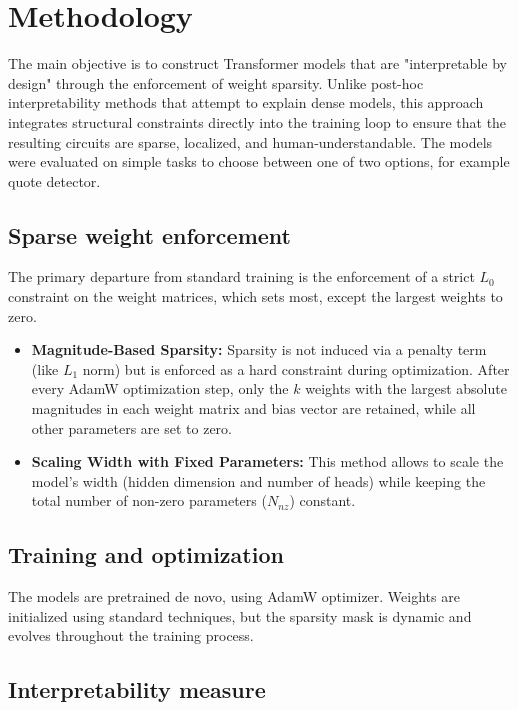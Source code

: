 \documentclass[a4paper,oneside,10pt,english]{scrartcl}
\begin{document}
\section{Methodology}
\label{sec:methodology}

The main objective is to construct Transformer models that are "interpretable by design" through the enforcement of weight sparsity. Unlike post-hoc interpretability methods that attempt to explain dense models, this approach integrates structural constraints directly into the training loop to ensure that the resulting circuits are sparse, localized, and human-understandable. The models were evaluated on simple tasks to choose between one of two options, for example quote detector.

\subsection{Sparse weight enforcement}

The primary departure from standard training is the enforcement of a strict $L_0$ constraint on the weight matrices, which sets most, except the largest weights to zero. 
\begin{itemize}
  \item \textbf{Magnitude-Based Sparsity:} Sparsity is not induced via a penalty term (like $L_1$ norm) but is enforced as a hard constraint during optimization. After every AdamW \textcite{loshchilov2019decoupledweightdecayregularization} optimization step, only the $k$ weights with the largest absolute magnitudes in each weight matrix and bias vector are retained, while all other parameters are set to zero.
  \item \textbf{Scaling Width with Fixed Parameters:} This method allows to scale the model's width (hidden dimension and number of heads) while keeping the total number of non-zero parameters ($N_{nz}$) constant.
\end{itemize}

\subsection{Training and optimization}

The models are pretrained de novo, using AdamW optimizer. Weights are initialized using standard techniques, but the sparsity mask is dynamic and evolves throughout the training process.

\subsection{Interpretability measure}
\end{document}
